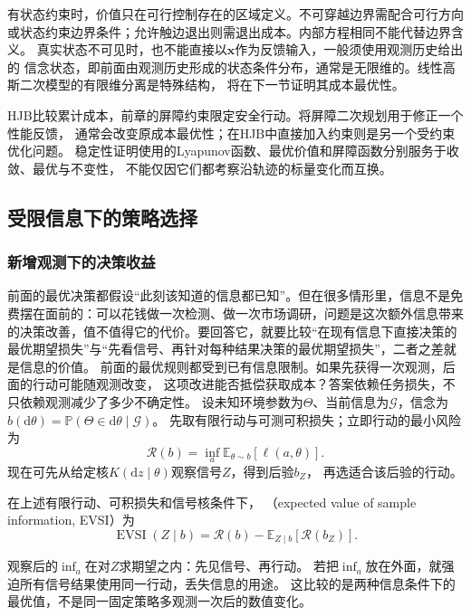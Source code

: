 有状态约束时，价值只在可行控制存在的区域定义。不可穿越边界需配合可行方向
或状态约束边界条件；允许触边退出则需退出成本。内部方程相同不能代替边界含义。
真实状态不可见时，也不能直接以$\bm x$作为反馈输入，一般须使用观测历史给出的
信念状态，即前面由观测历史形成的状态条件分布，通常是无限维的。线性高斯二次模型的有限维分离是特殊结构，
将在下一节证明其成本最优性。

HJB比较累计成本，前章的屏障约束限定安全行动。将屏障二次规划用于修正一个性能反馈，
通常会改变原成本最优性；在HJB中直接加入约束则是另一个受约束优化问题。
稳定性证明使用的Lyapunov函数、最优价值和屏障函数分别服务于收敛、最优与不变性，
不能仅因它们都考察沿轨迹的标量变化而互换。

\subsection{受限信息下的策略选择}
\label{sec:decision-value-of-information}

\subsubsection{新增观测下的决策收益}

前面的最优决策都假设“此刻该知道的信息都已知”。但在很多情形里，信息不是免费摆在面前的：可以花钱做一次检测、做一次市场调研，问题是这次额外信息带来的决策改善，值不值得它的代价。要回答它，就要比较“在现有信息下直接决策的最优期望损失”与“先看信号、再针对每种结果决策的最优期望损失”，二者之差就是信息的价值。
前面的最优规则都受到已有信息限制。如果先获得一次观测，后面的行动可能随观测改变，
这项改进能否抵偿获取成本？答案依赖任务损失，不只依赖观测减少了多少不确定性。
设未知环境参数为$\Theta$、当前信息为$\mathcal G$，信念为
$b(\mathrm d\theta)=\mathbb P(\Theta\in\mathrm d\theta\mid\mathcal G)$。
先取有限行动与可测可积损失；立即行动的最小风险为
\[
  \mathcal R(b)=\inf_a\mathbb E_{\theta\sim b}[\ell(a,\theta)].
\]
现在可先从给定核$K(\mathrm dz\mid\theta)$观察信号$Z$，得到后验$b_Z$，
再选适合该后验的行动。

\begin{definition}[期望样本信息价值]
\label{def:decision-expected-sample-information-value}
在上述有限行动、可积损失和信号核条件下，
（expected value of sample information, EVSI）为
\begin{equation}
  \operatorname{EVSI}(Z\mid b)
  =\mathcal R(b)-\mathbb E_{Z\mid b}[\mathcal R(b_Z)].
  \label{eq:decision-evsi}
\end{equation}
\end{definition}
观察后的$\inf_a$在对$Z$求期望之内：先见信号、再行动。
若把$\inf_a$放在外面，就强迫所有信号结果使用同一行动，丢失信息的用途。
这比较的是两种信息条件下的最优值，不是同一固定策略多观测一次后的数值变化。

